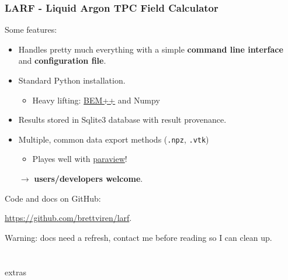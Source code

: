 \documentclass[xcolor=dvipsnames]{beamer}
\begin{document}
\begin{frame}[fragile]
  \frametitle{LARF - \textbf{L}iquid \textbf{Ar}gon TPC \textbf{F}ield Calculator}

  Some features:
  \begin{itemize}
  \item Handles pretty much everything with a simple \textbf{command line interface} and \textbf{configuration file}.
  \item Standard Python installation.
    \begin{itemize}
    \item Heavy lifting: \href{http://www.bempp.org/}{BEM++} and Numpy
    \end{itemize}
  \item Results stored in Sqlite3 database with result provenance.
  \item Multiple, common data export methods (\texttt{.npz}, \texttt{.vtk})
    \begin{itemize}
    \item Playes well with \href{http://www.paraview.org}{paraview}!
    \end{itemize}
  \item[$\rightarrow$] \textbf{users/developers welcome}.
  \end{itemize}

  Code and docs on GitHub:
  \begin{center}
    \url{https://github.com/brettviren/larf}.    
  \end{center}

  \scriptsize Warning: docs need a refresh, contact me before reading so I can clean up.
\end{frame}

\section{}

\begin{frame}
  \begin{center}
      \Huge extras
  \end{center}
\end{frame}
\end{document}
